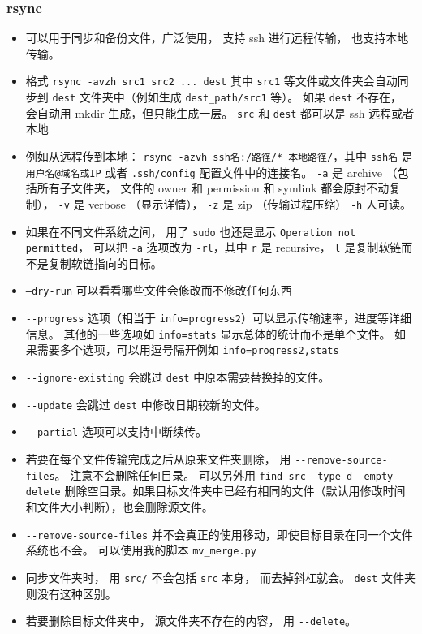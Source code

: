 \subsubsection{rsync}
\begin{itemize}
\item 可以用于同步和备份文件，广泛使用， 支持 ssh 进行远程传输， 也支持本地传输。
\item 格式 \verb`rsync -avzh src1 src2 ... dest` 其中 \verb`src1` 等文件或文件夹会自动同步到 \verb`dest` 文件夹中（例如生成 \verb`dest_path/src1` 等）。 如果 \verb`dest` 不存在， 会自动用 mkdir 生成，但只能生成一层。 \verb`src` 和 \verb`dest` 都可以是 ssh 远程或者本地
\item 例如从远程传到本地： \verb`rsync -azvh ssh名:/路径/* 本地路径/`，其中 \verb`ssh名` 是 \verb`用户名@域名或IP` 或者 \verb`.ssh/config` 配置文件中的连接名。 \verb`-a` 是 archive （包括所有子文件夹， 文件的 owner 和 permission 和 symlink 都会原封不动复制）， \verb`-v` 是 verbose （显示详情）， \verb`-z` 是 zip （传输过程压缩） \verb`-h` 人可读。
\item 如果在不同文件系统之间， 用了 \verb`sudo` 也还是显示 \verb`Operation not permitted`， 可以把 \verb`-a` 选项改为 \verb`-rl`，其中 \verb`r` 是 recursive， \verb`l` 是复制软链而不是复制软链指向的目标。
\item \verb`–dry-run` 可以看看哪些文件会修改而不修改任何东西
\item \verb`--progress` 选项（相当于 \verb`info=progress2`）可以显示传输速率，进度等详细信息。 其他的一些选项如 \verb`info=stats` 显示总体的统计而不是单个文件。 如果需要多个选项，可以用逗号隔开例如 \verb`info=progress2,stats`
\item \verb`--ignore-existing` 会跳过 \verb`dest` 中原本需要替换掉的文件。
\item \verb`--update` 会跳过 \verb`dest` 中修改日期较新的文件。
\item \verb`--partial` 选项可以支持中断续传。
\item 若要在每个文件传输完成之后从原来文件夹删除， 用 \verb`--remove-source-files`。 注意不会删除任何目录。 可以另外用 \verb`find src -type d -empty -delete` 删除空目录。如果目标文件夹中已经有相同的文件（默认用修改时间和文件大小判断），也会删除源文件。
\item \verb`--remove-source-files` 并不会真正的使用移动，即使目标目录在同一个文件系统也不会。 可以使用我的脚本 \verb`mv_merge.py`
\item 同步文件夹时， 用 \verb`src/` 不会包括 \verb`src` 本身， 而去掉斜杠就会。 \verb`dest` 文件夹则没有这种区别。
\item 若要删除目标文件夹中， 源文件夹不存在的内容， 用 \verb`--delete`。

\end{itemize}

